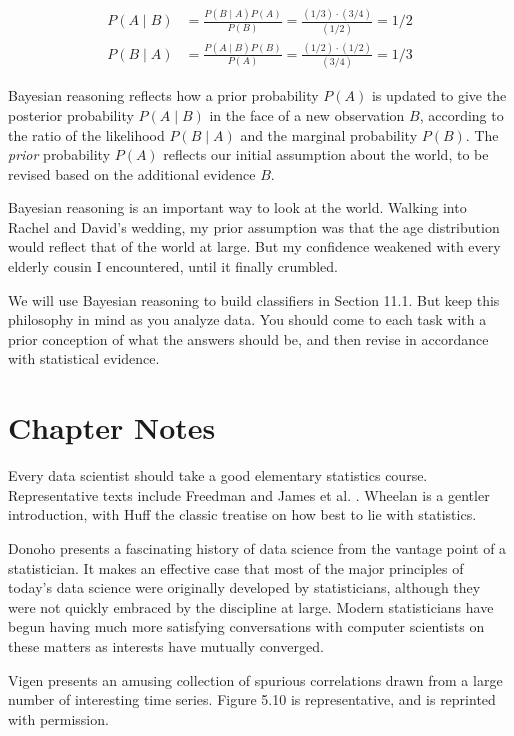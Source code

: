 \documentclass[10pt]{article}
\begin{document}
\[
\begin{aligned}
P(A \mid B) &= \frac{P(B \mid A) P(A)}{P(B)} = \frac{(1 / 3) \cdot (3 / 4)}{(1 / 2)} = 1 / 2 \\
P(B \mid A) &= \frac{P(A \mid B) P(B)}{P(A)} = \frac{(1 / 2) \cdot (1 / 2)}{(3 / 4)} = 1 / 3
\end{aligned}
\]

Bayesian reasoning reflects how a prior probability $P(A)$ is updated to give the posterior probability $P(A \mid B)$ in the face of a new observation $B$, according to the ratio of the likelihood $P(B \mid A)$ and the marginal probability $P(B)$. The \textit{prior} probability $P(A)$ reflects our initial assumption about the world, to be revised based on the additional evidence $B$.

Bayesian reasoning is an important way to look at the world. Walking into Rachel and David’s wedding, my prior assumption was that the age distribution would reflect that of the world at large. But my confidence weakened with every elderly cousin I encountered, until it finally crumbled.

We will use Bayesian reasoning to build classifiers in Section 11.1. But keep this philosophy in mind as you analyze data. You should come to each task with a prior conception of what the answers should be, and then revise in accordance with statistical evidence.

\section{Chapter Notes}
Every data scientist should take a good elementary statistics course. Representative texts include Freedman \cite{FPP07} and James et al. \cite{JWHT13}. Wheelan \cite{Whe13} is a gentler introduction, with Huff \cite{Huf10} the classic treatise on how best to lie with statistics.

Donoho \cite{Don15} presents a fascinating history of data science from the vantage point of a statistician. It makes an effective case that most of the major principles of today’s data science were originally developed by statisticians, although they were not quickly embraced by the discipline at large. Modern statisticians have begun having much more satisfying conversations with computer scientists on these matters as interests have mutually converged.

Vigen \cite{Vig15} presents an amusing collection of spurious correlations drawn from a large number of interesting time series. Figure 5.10 is representative, and is reprinted with permission.
\end{document}
